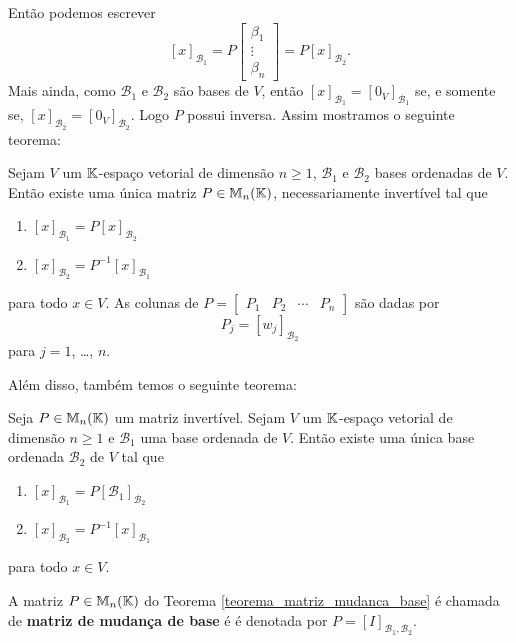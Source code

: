 Então podemos escrever
\[
	[x]_{\mathcal{B}_1} = P \begin{bmatrix}
		\beta_1\\ 
		\vdots\\
		\beta_n
	\end{bmatrix} = P[x]_{\mathcal{B}_2}.
\]
Mais ainda, como $\mathcal{B}_1$ e $\mathcal{B}_2$ são bases de $V$, então $[x]_{\mathcal{B}_1} = [0_V]_{\mathcal{B}_1}$ se, e somente se, $[x]_{\mathcal{B}_2} = [0_V]_{\mathcal{B}_2}$. Logo $P$ possui inversa. Assim mostramos o seguinte teorema:

\begin{teorema}\label{teorema_mudanca_base}
	Sejam $V$ um $\mathbb{K}$-espaço vetorial de dimensão $n \ge 1$, $\mathcal{B}_1$ e $\mathcal{B}_2$ bases ordenadas de $V$. Então existe uma única matriz $P \in \mathbb{M}_n(\mathbb{K})$, necessariamente invertível tal que
	\begin{enumerate}
		\item $[x]_{\mathcal{B}_1} = P[x]_{\mathcal{B}_2}$
		\item $[x]_{\mathcal{B}_2} = P^{-1}[x]_{\mathcal{B}_1}$
	\end{enumerate}
	para todo $x \in V$. As colunas de $P = \begin{bmatrix}
		P_1 & P_2 & \cdots & P_n
	\end{bmatrix}$ são dadas por
	\[
		P_j = [w_j]_{\mathcal{B}_2}
	\]
	para $j = 1$, \dots, $n$.
\end{teorema}

Além disso, também temos o seguinte teorema:

\begin{teorema}\label{teorema_matriz_mudanca_base}
	Seja $P \in \mathbb{M}_n(\mathbb{K})$ um matriz invertível. Sejam $V$ um $\mathbb{K}$-espaço vetorial de dimensão $n \ge 1$ e $\mathcal{B}_1$ uma base ordenada de $V$. Então existe uma única base ordenada $\mathcal{B}_2$ de $V$ tal que
	\begin{enumerate}
		\item $[x]_{\mathcal{B}_1} = P[\mathcal{B}_1]_{\mathcal{B}_2}$
		\item $[x]_{\mathcal{B}_2} = P^{-1}[x]_{\mathcal{B}_1}$
	\end{enumerate}
	para todo $x \in V$.
\end{teorema}

\begin{definicao}
	A matriz $P \in \mathbb{M}_n(\mathbb{K})$ do Teorema \ref{teorema_matriz_mudanca_base} é chamada de \textbf{matriz de mudança de base} é é denotada por $P = [I]_{{\mathcal{B}_1},{\mathcal{B}_2}}$.
\end{definicao}
